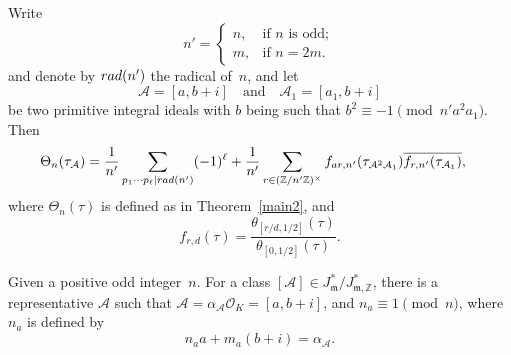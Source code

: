 \documentclass[10pt,a4paper]{amsart}
\begin{document}
\begin{proposition}\label{corthetaf}
      Write 
$$
n'=\begin{cases}
    n,&\mbox{if $n$ is odd};\\
    m,&\mbox{if $n=2m$}.
\end{cases}
$$   
and denote by ${\rm rad}(n')$ the radical of~$n$, and let 
    $$
    \mathcal{A}=[a,b+i]\quad\mbox{and}\quad \mathcal{A}_{1}=[a_{1},b+i]
    $$
    be two primitive integral ideals with $b$ being  such that $b^{2}\equiv-1\pmod{n'a^{2}a_{1}}$. Then
    \begin{align*}
       \Theta_{n}(\tau_{\mathcal{A}})&=\frac{1}{n'}\sum_{p_{1}\cdots p_{\ell}|{\rm rad}(n')}(-1)^{\ell}+\frac{1}{n'}\sum_{r\in(\mathbb{Z}/n'\mathbb{Z})^{\times}}f_{ar,n'}(\tau_{\mathcal{A}^{2}\mathcal{A}_{1}})\overline{f_{r,n'}(\tau_{\mathcal{A}_{1}})},
    \end{align*}
    where $\Theta_{n}(\tau)$ is defined as in Theorem~\ref{main2}, and
    $$
    f_{r,d}(\tau)=\frac{\theta_{[r/d,1/2]}(\tau)}{\theta_{[0,1/2]}(\tau)}.
    $$
\end{proposition}

\begin{lemma}\label{lemna}
Given a positive odd integer~$n$.    For a class $[\mathcal{A}]\in J_{\mathfrak{m}}^{*}/J_{\mathfrak{m},\mathbb{Z}}^{*}$,  there is a representative $\mathcal{A}$ such that $\mathcal{A}=\alpha_{\mathcal{A}}\mathcal{O}_{K}=[a,b+i]$, and $n_{a}\equiv1\pmod{n}$, where $n_{a}$ is defined by
$$
n_{a}a+m_{a}(b+i)=\alpha_{\mathcal{A}}.
$$

\end{lemma}
\end{document}
